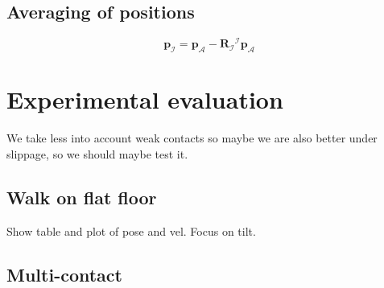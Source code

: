 \documentclass{IJCAS}
\begin{document}



            
\subsection{Averaging of positions}
\begin{equation}
    \boldsymbol{p}_{\mathcal{I}} = \boldsymbol{p}_{\mathcal{A}} - \boldsymbol{R}_{\mathcal{I}} {}^{\mathcal{I}}\boldsymbol{p}_{\mathcal{A}} 
\end{equation}

\section{Experimental evaluation}

We take less into account weak contacts so maybe we are also better under slippage, so we should maybe test it.


\subsection{Walk on flat floor}
Show table and plot of pose and vel. Focus on tilt.

\subsection{Multi-contact}
\end{document}

